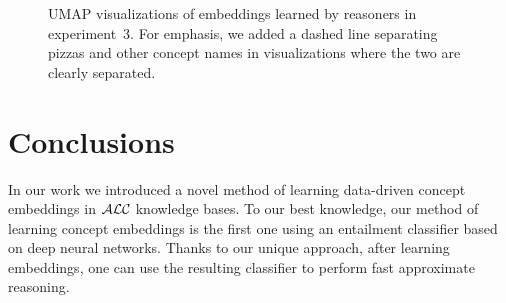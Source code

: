 \begin{figure}
\vspace*{-0.5cm}
\caption{UMAP visualizations of embeddings learned by reasoners in experiment~3. For emphasis, we added a dashed line separating pizzas and other concept names in visualizations where the two are clearly separated.}
\label{fig:ex4-emb}
\end{figure}


\chapter{Conclusions}
\label{sec:conclusions}

In our work we introduced a novel method of learning data-driven concept embeddings in $\mathcal{ALC}$ knowledge bases.
To our best knowledge, our method of learning concept embeddings is the first one using an entailment classifier based on deep neural networks.
Thanks to our unique approach, after learning embeddings, one can use the resulting classifier to perform fast approximate reasoning.

